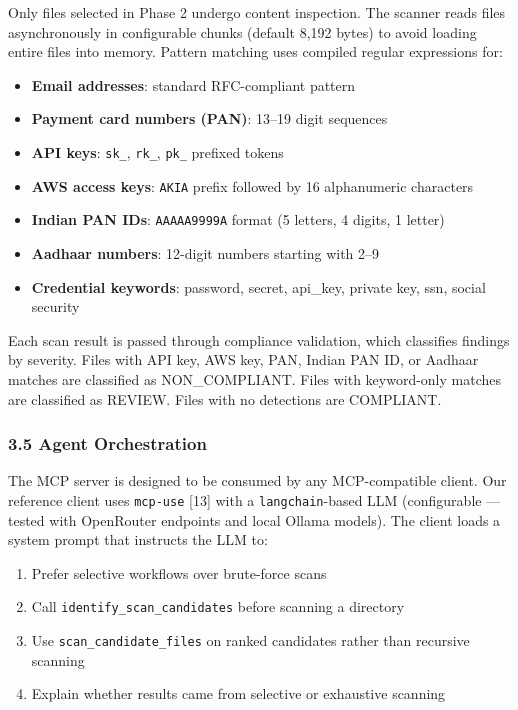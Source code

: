 \documentclass[
]{article}
\providecommand{\tightlist}{%
  \setlength{\itemsep}{0pt}\setlength{\parskip}{0pt}}
\begin{document}
Only files selected in Phase 2 undergo content inspection. The scanner
reads files asynchronously in configurable chunks (default 8,192 bytes)
to avoid loading entire files into memory. Pattern matching uses
compiled regular expressions for:

\begin{itemize}
\tightlist
\item
  \textbf{Email addresses}: standard RFC-compliant pattern
\item
  \textbf{Payment card numbers (PAN)}: 13--19 digit sequences
\item
  \textbf{API keys}: \texttt{sk\_}, \texttt{rk\_}, \texttt{pk\_}
  prefixed tokens
\item
  \textbf{AWS access keys}: \texttt{AKIA} prefix followed by 16
  alphanumeric characters
\item
  \textbf{Indian PAN IDs}: \texttt{AAAAA9999A} format (5 letters, 4
  digits, 1 letter)
\item
  \textbf{Aadhaar numbers}: 12-digit numbers starting with 2--9
\item
  \textbf{Credential keywords}: password, secret, api\_key, private key,
  ssn, social security
\end{itemize}

Each scan result is passed through compliance validation, which
classifies findings by severity. Files with API key, AWS key, PAN,
Indian PAN ID, or Aadhaar matches are classified as NON\_COMPLIANT.
Files with keyword-only matches are classified as REVIEW. Files with no
detections are COMPLIANT.

\subsubsection{3.5 Agent Orchestration}\label{agent-orchestration}

The MCP server is designed to be consumed by any MCP-compatible client.
Our reference client uses \texttt{mcp-use} {[}13{]} with a
\texttt{langchain}-based LLM (configurable --- tested with OpenRouter
endpoints and local Ollama models). The client loads a system prompt
that instructs the LLM to:

\begin{enumerate}
\def\labelenumi{\arabic{enumi}.}
\tightlist
\item
  Prefer selective workflows over brute-force scans
\item
  Call \texttt{identify\_scan\_candidates} before scanning a directory
\item
  Use \texttt{scan\_candidate\_files} on ranked candidates rather than
  recursive scanning
\item
  Explain whether results came from selective or exhaustive scanning
\end{enumerate}
\end{document}
